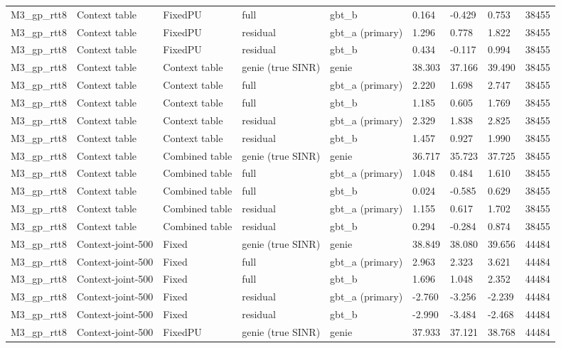 \documentclass[10pt]{article}
\begin{document}
\begin{landscape}
\begin{longtable}{@{}lllllllll@{}}
M3\_gp\_rtt8 & Context table & FixedPU & full & gbt\_b & 0.164 & -0.429 & 0.753 & 38455 \\
M3\_gp\_rtt8 & Context table & FixedPU & residual & gbt\_a (primary) & 1.296 & 0.778 & 1.822 & 38455 \\
M3\_gp\_rtt8 & Context table & FixedPU & residual & gbt\_b & 0.434 & -0.117 & 0.994 & 38455 \\
M3\_gp\_rtt8 & Context table & Context table & genie (true SINR) & genie & 38.303 & 37.166 & 39.490 & 38455 \\
M3\_gp\_rtt8 & Context table & Context table & full & gbt\_a (primary) & 2.220 & 1.698 & 2.747 & 38455 \\
M3\_gp\_rtt8 & Context table & Context table & full & gbt\_b & 1.185 & 0.605 & 1.769 & 38455 \\
M3\_gp\_rtt8 & Context table & Context table & residual & gbt\_a (primary) & 2.329 & 1.838 & 2.825 & 38455 \\
M3\_gp\_rtt8 & Context table & Context table & residual & gbt\_b & 1.457 & 0.927 & 1.990 & 38455 \\
M3\_gp\_rtt8 & Context table & Combined table & genie (true SINR) & genie & 36.717 & 35.723 & 37.725 & 38455 \\
M3\_gp\_rtt8 & Context table & Combined table & full & gbt\_a (primary) & 1.048 & 0.484 & 1.610 & 38455 \\
M3\_gp\_rtt8 & Context table & Combined table & full & gbt\_b & 0.024 & -0.585 & 0.629 & 38455 \\
M3\_gp\_rtt8 & Context table & Combined table & residual & gbt\_a (primary) & 1.155 & 0.617 & 1.702 & 38455 \\
M3\_gp\_rtt8 & Context table & Combined table & residual & gbt\_b & 0.294 & -0.284 & 0.874 & 38455 \\
M3\_gp\_rtt8 & Context-joint-500 & Fixed & genie (true SINR) & genie & 38.849 & 38.080 & 39.656 & 44484 \\
M3\_gp\_rtt8 & Context-joint-500 & Fixed & full & gbt\_a (primary) & 2.963 & 2.323 & 3.621 & 44484 \\
M3\_gp\_rtt8 & Context-joint-500 & Fixed & full & gbt\_b & 1.696 & 1.048 & 2.352 & 44484 \\
M3\_gp\_rtt8 & Context-joint-500 & Fixed & residual & gbt\_a (primary) & -2.760 & -3.256 & -2.239 & 44484 \\
M3\_gp\_rtt8 & Context-joint-500 & Fixed & residual & gbt\_b & -2.990 & -3.484 & -2.468 & 44484 \\
M3\_gp\_rtt8 & Context-joint-500 & FixedPU & genie (true SINR) & genie & 37.933 & 37.121 & 38.768 & 44484 \\

\end{longtable}
\end{landscape}
\end{document}
